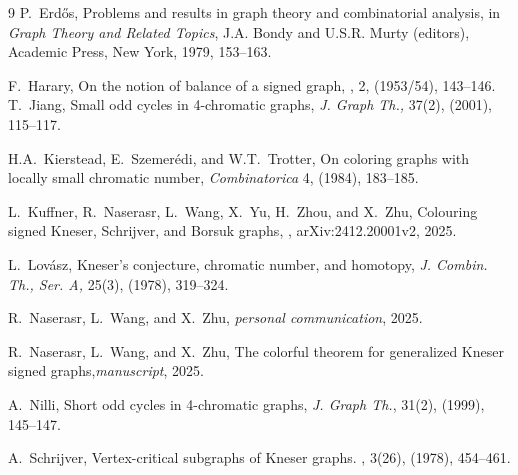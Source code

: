 \documentclass{article}
\begin{document}
\begin{thebibliography}{9}
        P.~Erd\H{o}s, \newblock Problems and results in graph theory and combinatorial analysis, \newblock in \emph{Graph Theory and Related Topics}, J.A. Bondy and U.S.R. Murty (editors), Academic Press, New York, 1979, 153--163.


        F.~Harary, \newblock On the notion of balance of a signed graph, , 2, (1953/54), 143--146.
T.~Jiang, \newblock Small odd cycles in 4-chromatic graphs, \newblock \emph{J. Graph Th.,} 37(2), (2001), 115--117.
        
        H.A.~Kierstead, E.~Szemerédi, and W.T.~Trotter, \newblock On coloring graphs with locally small chromatic number, \newblock \emph{Combinatorica} 4, (1984), 183--185.

L.~Kuffner, R.~Naserasr, L.~Wang, X.~Yu, H.~Zhou, and X.~Zhu, \newblock Colouring signed Kneser, Schrijver, and Borsuk graphs, , arXiv:2412.20001v2, 2025.



        L.~Lov\'{a}sz, \newblock
Kneser's conjecture, chromatic number, and homotopy,
{\em J. Combin. Th., Ser. A,}
25(3),
(1978), 319--324.

 R.~Naserasr, L.~Wang, and X.~Zhu, \newblock \emph{personal communication}, 2025.

 R.~Naserasr, L.~Wang, and X.~Zhu, \newblock The colorful theorem for generalized Kneser signed graphs,\newblock\emph{manuscript}, 2025.

A.~Nilli, \newblock Short odd cycles in 4-chromatic graphs, \newblock \emph{J. Graph Th.}, 31(2), (1999), 145--147.



        
        A.~Schrijver,
\newblock Vertex-critical subgraphs of Kneser graphs. , 3(26), (1978), 454--461.

\end{thebibliography}
\end{document}

